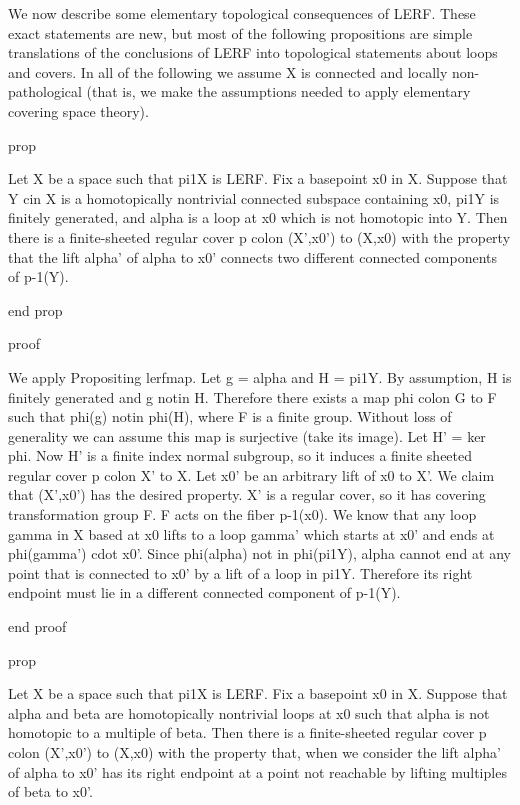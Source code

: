 
We now describe some elementary topological consequences of LERF. These exact
statements are new, but most of the following propositions are simple
translations of the conclusions of LERF into topological statements about loops
and covers. In all of the following we assume X is connected and locally
non-pathological (that is, we make the assumptions needed to apply elementary
covering space theory).

prop

Let X be a space such that pi1X is LERF. Fix a basepoint x0 in X. Suppose that
Y cin X is a homotopically nontrivial connected subspace containing x0, pi1Y is
finitely generated, and alpha is a loop at x0 which is not homotopic into Y.
Then there is a finite-sheeted regular cover p colon (X',x0') to (X,x0) with
the property that the lift alpha' of alpha to x0' connects two different
connected components of p-1(Y).

end prop

proof

We apply Propositing lerfmap. Let g = alpha and H = pi1Y. By assumption, H is
finitely generated and g notin H. Therefore there exists a map phi colon G to
F such that phi(g) notin phi(H), where F is a finite group. Without loss of
generality we can assume this map is surjective (take its image). Let H' = ker
phi. Now H' is a finite index normal subgroup, so it induces a finite sheeted
regular cover p colon X' to X. Let x0' be an arbitrary lift of x0 to X'. We
claim that (X',x0') has the desired property. X' is a regular cover, so it has
covering transformation group F. F acts on the fiber p-1(x0). We know that any
loop gamma in X based at x0 lifts to a loop gamma' which starts at x0' and ends
at phi(gamma') cdot x0'. Since phi(alpha) not in phi(pi1Y), alpha cannot end at
any point that is connected to x0' by a lift of a loop in pi1Y. Therefore its
right endpoint must lie in a different connected component of p-1(Y).

end proof

prop

Let X be a space such that pi1X is LERF. Fix a basepoint x0 in X. Suppose that
alpha and beta are homotopically nontrivial loops at x0 such that alpha is not
homotopic to a multiple of beta. Then there is a finite-sheeted regular cover
p colon (X',x0') to (X,x0) with the property that, when we consider the lift
alpha' of alpha to x0' has its right endpoint at a point not reachable by
lifting multiples of beta to x0'.

